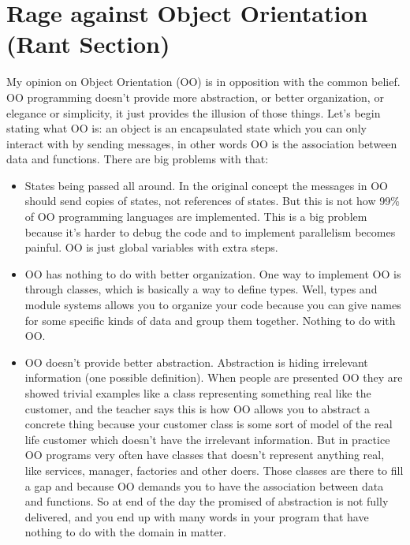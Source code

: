 \documentclass[11pt,a4paper,sans]{moderncv}
\begin{document}
\section{Rage against Object Orientation (Rant Section)}
My opinion on Object Orientation (OO) is in opposition with the common belief.
OO programming doesn't provide more abstraction, or better organization, or elegance or simplicity, it just provides the illusion of those things.
Let's begin stating what OO is:
an object is an encapsulated state which you can only interact with by sending messages, in other words OO is the association between data and functions.
There are big problems with that:
\begin{itemize}
  \item States being passed all around. In the original concept the messages in OO should send copies of states, not references of states.
        But this is not how 99\% of OO programming languages are implemented.
        This is a big problem because it's harder to debug the code and to implement parallelism becomes painful.
        OO is just global variables with extra steps.
  \item OO has nothing to do with better organization. One way to implement OO is through classes, which is basically a way to define types.
        Well, types and module systems allows you to organize your code because you can give names for some specific kinds of data and group them together.
        Nothing to do with OO.
  \item OO doesn't provide better abstraction.
        Abstraction is hiding irrelevant information (one possible definition).
        When people are presented OO they are showed trivial examples like a class representing something real like the customer,
        and the teacher says this is how OO allows you to abstract a concrete thing because your customer class is some sort of model
        of the real life customer which doesn't have the irrelevant information.
        But in practice OO programs very often have classes that doesn't represent anything real, like services, manager, factories and other doers.
        Those classes are there to fill a gap and because OO demands you to have the association between data and functions.
        So at end of the day the promised of abstraction is not fully delivered, and you end up with many words in your program that have nothing to do with the domain in matter.
\end{itemize}

\medskip
\end{document}
